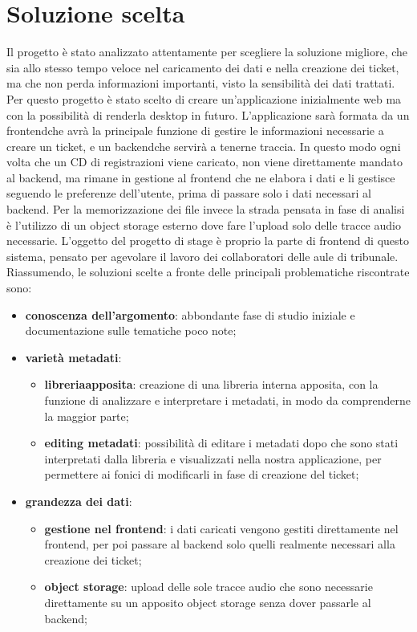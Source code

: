 \section{Soluzione scelta}
Il progetto è stato analizzato attentamente per scegliere la soluzione migliore, che sia allo stesso tempo veloce nel caricamento dei dati e nella creazione dei ticket, ma
che non perda informazioni importanti, visto la sensibilità dei dati trattati. Per questo progetto è stato scelto di creare un'applicazione inizialmente web ma con la possibilità
di renderla desktop in futuro. L'applicazione sarà formata da un \gls{frontend}\glsfirstoccur che avrà la principale funzione di gestire le informazioni necessarie a creare un ticket,
e un \gls{backend}\glsfirstoccur che servirà a tenerne traccia.
In questo modo ogni volta che un CD di registrazioni viene caricato, non viene direttamente mandato al backend, ma rimane in gestione al frontend che ne elabora i dati e li gestisce seguendo
le preferenze dell'utente, prima di passare solo i dati necessari al backend. Per la memorizzazione dei file invece la strada pensata in fase di analisi è l'utilizzo di un \gls{object storage}\glsfirstoccur
esterno dove fare l'upload solo delle tracce audio necessarie. L'oggetto del progetto di stage è proprio la parte di frontend di questo sistema, pensato per agevolare il lavoro dei
collaboratori delle aule di tribunale. Riassumendo, le soluzioni scelte a fronte delle principali problematiche riscontrate sono:
\begin{itemize}
  \item \textbf{conoscenza dell'argomento}: abbondante fase di studio iniziale e documentazione sulle tematiche poco note;
  \item \textbf{varietà metadati}:
        \begin{itemize}
          \item \textbf{\gls{libreria}\glsfirstoccur apposita}: creazione di una libreria interna apposita, con la funzione di analizzare e interpretare i metadati, in modo da comprenderne la maggior parte;
          \item \textbf{editing metadati}: possibilità di editare i metadati dopo che sono stati interpretati dalla libreria e visualizzati nella nostra applicazione, per permettere ai fonici di
                modificarli in fase di creazione del ticket;
        \end{itemize}
  \item \textbf{grandezza dei dati}:
        \begin{itemize}
          \item \textbf{gestione nel frontend}: i dati caricati vengono gestiti direttamente nel frontend, per poi passare al backend solo quelli realmente necessari alla creazione dei ticket;
          \item \textbf{object storage}: upload delle sole tracce audio che sono necessarie direttamente su un apposito object storage senza dover passarle al backend;
        \end{itemize}
\end{itemize}

